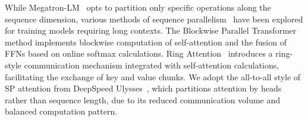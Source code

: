 


 While Megatron-LM~\cite{shoeybi2019megatron, korthikanti2023reducing} opts to partition only specific operations along the sequence dimension, various methods of sequence parallelism~\cite{li2024distflashattn, liu2023ring, li2021sequence, gu2024loongtrain} have been explored for training models requiring long contexts. The Blockwise Parallel Transformer~\cite{liu2024blockwise} method implements blockwise computation of self-attention and the fusion of FFNs based on online softmax calculations. Ring Attention~\cite{liu2023ring, li2021sequence} introduces a ring-style communication mechanism integrated with self-attention calculations, facilitating the exchange of key and value chunks. 
We adopt the all-to-all style of SP attention from DeepSpeed Ulysses~\cite{jacobs2023deepspeed}, which partitions attention by heads rather than sequence length, due to its reduced communication volume and balanced computation pattern.

